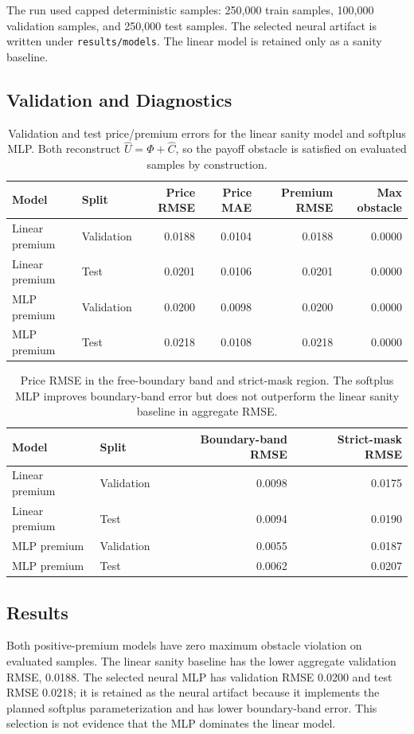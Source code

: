 \documentclass[11pt]{article}
\begin{document}
The run used capped deterministic samples: 250,000 train samples, 100,000 validation samples, and 250,000 test samples. The selected neural artifact is written under \texttt{results/models}. The linear model is retained only as a sanity baseline.

\subsection{Validation and Diagnostics}
\begin{table}[h]
\centering
\begin{tabular}{llrrrr}
\toprule
Model & Split & Price RMSE & Price MAE & Premium RMSE & Max obstacle\\
\midrule
Linear premium & Validation & 0.0188 & 0.0104 & 0.0188 & 0.0000\\
Linear premium & Test & 0.0201 & 0.0106 & 0.0201 & 0.0000\\
MLP premium & Validation & 0.0200 & 0.0098 & 0.0200 & 0.0000\\
MLP premium & Test & 0.0218 & 0.0108 & 0.0218 & 0.0000\\
\bottomrule
\end{tabular}
\caption{Validation and test price/premium errors for the linear sanity model and softplus MLP. Both reconstruct \(\widehat U=\Phi+\widehat C\), so the payoff obstacle is satisfied on evaluated samples by construction.}
\end{table}

\begin{table}[h]
\centering
\begin{tabular}{llrr}
\toprule
Model & Split & Boundary-band RMSE & Strict-mask RMSE\\
\midrule
Linear premium & Validation & 0.0098 & 0.0175\\
Linear premium & Test & 0.0094 & 0.0190\\
MLP premium & Validation & 0.0055 & 0.0187\\
MLP premium & Test & 0.0062 & 0.0207\\
\bottomrule
\end{tabular}
\caption{Price RMSE in the free-boundary band and strict-mask region. The softplus MLP improves boundary-band error but does not outperform the linear sanity baseline in aggregate RMSE.}
\end{table}

\subsection{Results}
Both positive-premium models have zero maximum obstacle violation on evaluated
samples. The linear sanity baseline has the lower aggregate validation RMSE,
0.0188. The selected neural MLP has validation RMSE 0.0200 and test RMSE
0.0218; it is retained as the neural artifact because it implements the planned
softplus parameterization and has lower boundary-band error. This selection is
not evidence that the MLP dominates the linear model.
\end{document}
